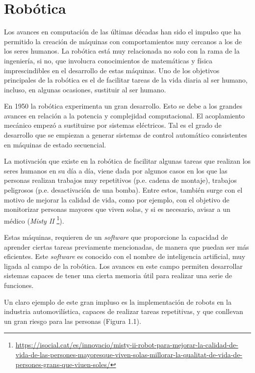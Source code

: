 \documentclass[a4paper, 12pt]{book}
\begin{document}
\section{Robótica}
\label{sec:robotica}


Los avances en computación de las últimas décadas han sido el impulso que ha permitido la creación de máquinas con comportamientos muy cercanos a los de los seres humanos. La robótica está muy relacionada no solo con la rama de la ingeniería, si no, que involucra conocimientos de matemáticas y física imprescindibles en el desarrollo de estas máquinas. Uno de los objetivos principales de la robótica es el de facilitar tareas de la vida diaria al ser humano, incluso, en algunas ocasiones, sustituir al ser humano.

En 1950 la robótica experimenta un gran desarrollo. Esto se debe a los grandes avances en relación a la potencia y complejidad computacional. El acoplamiento mecánico empezó a sustituirse por sistemas eléctricos. Tal es el grado de desarrollo que se empiezan a generar sistemas de control automático consistentes en máquinas de estado secuencial.

La motivación que existe en la robótica de facilitar algunas tareas que realizan los seres humanos en su día a día, viene dada por algunos casos en los que las personas realizan trabajos muy repetitivos (p.e. cadena de montaje), trabajos peligrosos (p.e. desactivación de una bomba). Entre estos, también surge con el motivo de mejorar la calidad de vida, como por ejemplo, con el objetivo de monitorizar personas mayores que viven solas, y si es necesario, avisar a un médico (\emph{Misty II} \footnote{\url{https://isocial.cat/es/innovacio/misty-ii-robot-para-mejorar-la-calidad-de-vida-de-las-persones-mayoresque-viven-solas-millorar-la-qualitat-de-vida-de-persones-grans-que-viuen-soles/}}).


Estas máquinas, requieren de un \emph{software} que proporcione la capacidad de aprender ciertas tareas previamente mencionadas, de manera que puedan ser más eficientes. Este \emph{software} es conocido con el nombre de inteligencia artificial, muy ligada al campo de la robótica. Los avances en este campo permiten desarrollar sistemas capaces de tener una cierta memoria útil para realizar una serie de funciones.


Un claro ejemplo de este gran impluso es la implementación de robots en la industria automovilística, capaces de realizar tareas repetitivas, y que conllevan un gran riesgo para las personas (Figura 1.1).
\end{document}
